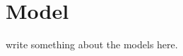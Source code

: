 \documentclass[
thesis.tex
]{subfiles}
\begin{document}
	\newpage
	
	\section{Model}
	
	{
		\setlength{\parskip}{1pt}
		\singlespacing
		
		\localtableofcontents
	}
	
	write something about the models here.	
\end{document}
